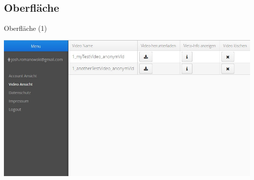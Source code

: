 \documentclass[19pt]{beamer}
\begin{document}
\subsection{Oberfläche}
\begin{frame}{Oberfläche (1)}
\begin{center}
\includegraphics[scale=0.4]{resources/ServiceDemo.jpg}
\end{center}
\end{frame}
\end{document}

